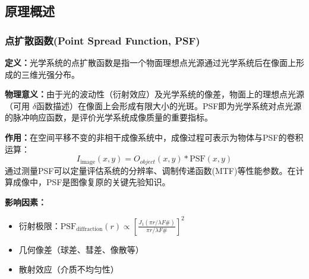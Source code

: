 \subsection{原理概述}
\subsubsection{点扩散函数(Point Spread Function, PSF)}
\textbf{定义：}光学系统的点扩散函数是指一个物面理想点光源通过光学系统后在像面上形成的三维光强分布。

\textbf{物理意义：}由于光的波动性（衍射效应）及光学系统的像差，物面上的理想点光源（可用 $\delta$函数描述）在像面上会形成有限大小的光斑。PSF即为光学系统对点光源的脉冲响应函数，是评价光学系统成像质量的重要指标。

\textbf{作用：}在空间平移不变的非相干成像系统中，成像过程可表示为物体与PSF的卷积运算：
\[ I_{\text{image}}(x,y) = O_{object}(x,y) \ast \text{PSF}(x,y) \]
通过测量PSF可以定量评估系统的分辨率、调制传递函数(MTF)等性能参数。在计算成像中，PSF是图像复原的关键先验知识。

\textbf{影响因素：}
\begin{itemize}
    \item 衍射极限：$\text{PSF}_{\text{diffraction}}(r) \propto \left[\frac{J_1(\pi r/\lambda F\#)}{\pi r/\lambda F\#}\right]^2$
    \item 几何像差（球差、彗差、像散等）
    \item 散射效应（介质不均匀性）
\end{itemize}









